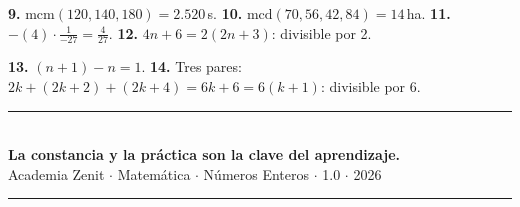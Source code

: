 \documentclass[11pt, letterpaper]{article}
\begin{document}
\textbf{9.} $\text{mcm}(120,140,180)=2.520$\,s. \quad \textbf{10.} $\text{mcd}(70,56,42,84)=14$\,ha. \quad \textbf{11.} $-(4)\cdot\frac{1}{-27}=\frac{4}{27}$. \quad \textbf{12.} $4n+6=2(2n+3)$: divisible por 2.

\textbf{13.} $(n+1)-n=1$. \quad \textbf{14.} Tres pares: $2k+(2k+2)+(2k+4)=6k+6=6(k+1)$: divisible por 6.

\vspace{8pt}
\begin{center}
  \rule{\linewidth}{1.5pt}\\[4pt]
  {\large\bfseries\color{zenitnavy} La constancia y la pr\'actica son la clave del aprendizaje.}\\[2pt]
  {\color{zenitgold}\small Academia Zenit $\cdot$ Matem\'atica $\cdot$ N\'umeros Enteros $\cdot$ 1.0 $\cdot$ 2026}
  \rule{\linewidth}{1.5pt}
\end{center}
\end{document}
